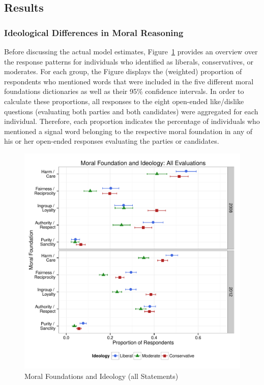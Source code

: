 \documentclass[12pt]{article}
\begin{document}
\subsection{Results}

\subsubsection{Ideological Differences in Moral Reasoning}

Before discussing the actual model estimates, Figure~\ref{fig:mft_ideol} provides an overview over the response patterns for individuals who identified as liberals, conservatives, or moderates. For each group, the Figure displays the (weighted) proportion of respondents who mentioned words that were included in the five different moral foundations dictionaries as well as their 95\% confidence intervals. In order to calculate these proportions, all responses to the eight open-ended like/dislike questions (evaluating both parties and both candidates) were aggregated for each individual. Therefore, each proportion indicates the percentage of individuals who mentioned a signal word belonging to the respective moral foundation in any of his or her open-ended responses evaluating the parties or candidates.

\begin{figure}[ht]\centering
\includegraphics[scale=.5]{../calc/fig/p1_mft_ideol.pdf}
\caption{Moral Foundations and Ideology (all Statements)}\label{fig:mft_ideol}
\end{figure}
\end{document}
